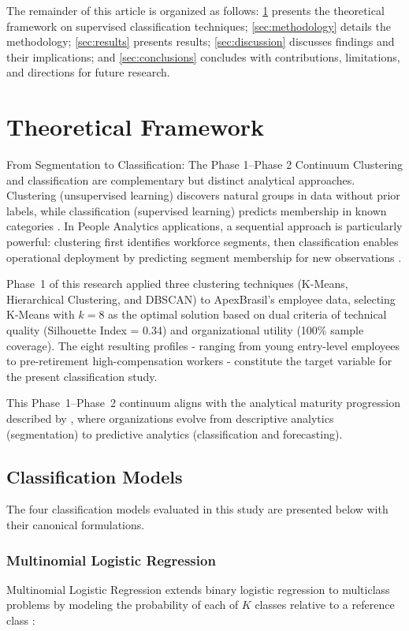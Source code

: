 \documentclass[alpha-refs,english]{RBCA_v3.0}
\begin{document}
The remainder of this article is organized as follows: \cref{sec:framework} presents the theoretical framework on supervised classification techniques; \cref{sec:methodology} details the methodology; \cref{sec:results} presents results; \cref{sec:discussion} discusses findings and their implications; and \cref{sec:conclusions} concludes with contributions, limitations, and directions for future research.


\section{Theoretical Framework}
\label{sec:framework}

From Segmentation to Classification: The Phase 1--Phase 2 Continuum
Clustering and classification are complementary but distinct analytical approaches. Clustering (unsupervised learning) discovers natural groups in data without prior labels, while classification (supervised learning) predicts membership in known categories \citep{Rokach2005}. In People Analytics applications, a sequential approach is particularly powerful: clustering first identifies workforce segments, then classification enables operational deployment by predicting segment membership for new observations \citep{Edwards2019,Garg2022}.

Phase~1 of this research \citep{Moreira2026} applied three clustering techniques (K-Means, Hierarchical Clustering, and DBSCAN) to ApexBrasil's employee data, selecting K-Means with $k=8$ as the optimal solution based on dual criteria of technical quality (Silhouette Index = 0.34) and organizational utility (100\% sample coverage). The eight resulting profiles - ranging from young entry-level employees to pre-retirement high-compensation workers - constitute the target variable for the present classification study.

This Phase~1--Phase~2 continuum aligns with the analytical maturity progression described by \cite{Lismont2017}, where organizations evolve from descriptive analytics (segmentation) to predictive analytics (classification and forecasting).

\subsection{Classification Models}
The four classification models evaluated in this study are presented below 
with their canonical formulations.

\subsubsection{Multinomial Logistic Regression}
Multinomial Logistic Regression extends binary logistic regression to 
multiclass problems by modeling the probability of each of $K$ classes 
relative to a reference class \citep{Hosmer2013,Cox1958,Menard2008}:
\end{document}
